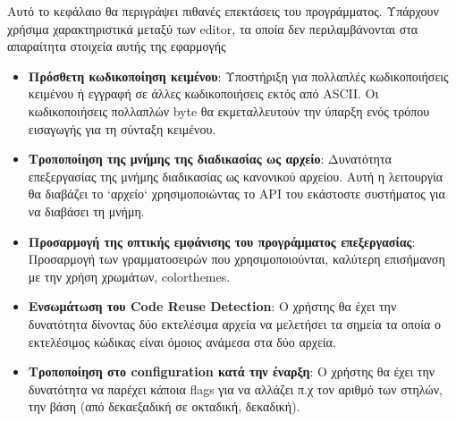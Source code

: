 Αυτό το κεφάλαιο θα περιγράψει πιθανές επεκτάσεις του προγράμματος.
Υπάρχουν χρήσιμα χαρακτηριστικά μεταξύ των editor, τα οποία δεν περιλαμβάνονται στα απαραίτητα στοιχεία αυτής της εφαρμογής
\begin{itemize}
    \item \textbf{Πρόσθετη κωδικοποίηση κειμένου}: Υποστήριξη για πολλαπλές κωδικοποιήσεις κειμένου ή εγγραφή σε άλλες κωδικοποιήσεις εκτός από ASCII. Οι κωδικοποιήσεις πολλαπλών byte θα εκμεταλλευτούν την ύπαρξη ενός τρόπου εισαγωγής για τη σύνταξη κειμένου.
    \item \textbf{Τροποποίηση της μνήμης της διαδικασίας ως αρχείο}:
      Δυνατότητα επεξεργασίας της μνήμης διαδικασίας ως κανονικού αρχείου. Αυτή η λειτουργία  θα διαβάζει το `αρχείο` χρησιμοποιώντας το API του εκάστοστε συστήματος για να διαβάσει τη μνήμη.
    \item \textbf{Προσαρμογή της οπτικής εμφάνισης του προγράμματος επεξεργασίας}:
      Προσαρμογή των γραμματοσειρών που χρησιμοποιούνται, καλύτερη επισήμανση με την χρήση χρωμάτων, colorthemes.
    \item \textbf{Ενσωμάτωση του Code Reuse Detection}: Ο χρήστης θα έχει την δυνατότητα δίνοντας δύο εκτελέσιμα αρχεία να μελετήσει τα σημεία τα οποία ο εκτελέσιμος κώδικας είναι όμοιος ανάμεσα στα δύο αρχεία.
	\item \textbf{Τροποποίηση στο configuration κατά την έναρξη}: Ο χρήστης θα έχει την δυνατότητα να παρέχει κάποια flags για να αλλάζει π.χ τον αριθμό των στηλών, την βάση (από δεκαεξαδική σε οκταδική, δεκαδική).
\end{itemize}
